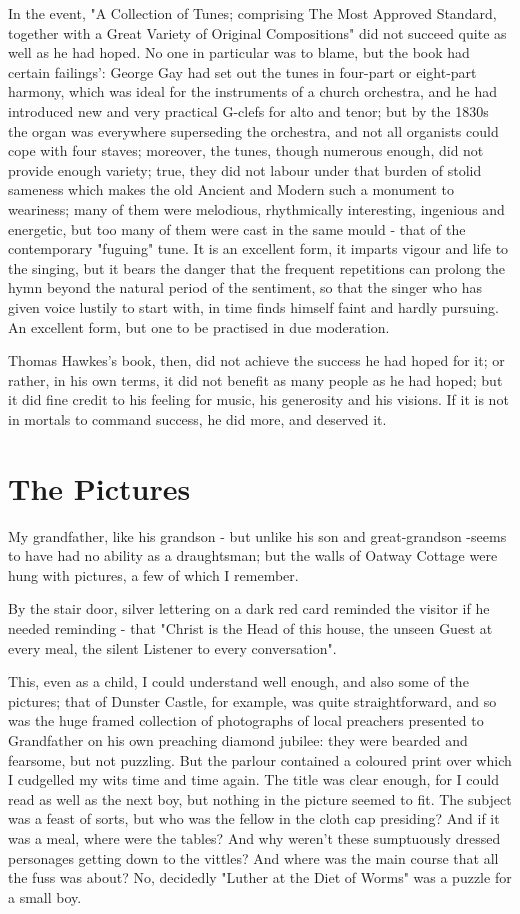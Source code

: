 In the event, "A Collection of Tunes; comprising The Most Approved Standard, together with a Great Variety of Original Compositions" did not succeed quite as well as he had hoped. No one in particular was to blame, but the book had certain failings': George Gay had set out the tunes in four-part or eight-part harmony, which was ideal for the instruments of a church orchestra, and he had introduced new and very practical G-clefs for alto and tenor; but by the 1830s the organ was everywhere superseding the orchestra, and not all organists could cope with four staves; moreover, the tunes, though numerous enough, did not provide enough variety; true, they did not labour under that burden of stolid sameness which makes the old Ancient and Modern such a monument to weariness; many of them were melodious, rhythmically interesting, ingenious and energetic, but too many of them were cast in the same mould - that of the contemporary "fuguing" tune. It is an excellent form, it imparts vigour and life to the singing, but it bears the danger that the frequent repetitions can prolong the hymn beyond the natural period of the sentiment, so that the singer who has given voice lustily to start with, in time finds himself faint and hardly pursuing. An excellent form, but one to be practised in due moderation.

Thomas Hawkes's book, then, did not achieve the success he had hoped for it; or rather, in his own terms, it did not benefit as many people as he had hoped; but it did fine credit to his feeling for music, his generosity and his visions. If it is not in mortals to command success, he did more, and deserved it.
 
\section{The Pictures}

My grandfather, like his grandson - but unlike his son and great-grandson -seems to have had no ability as a draughtsman; but the walls of Oatway Cottage were hung with pictures, a few of which I remember.

By the stair door, silver lettering on a dark red card reminded the visitor if he needed reminding - that "Christ is the Head of this house, the unseen Guest at every meal, the silent Listener to every conversation".

This, even as a child, I could understand well enough, and also some of the pictures; that of Dunster Castle, for example, was quite straightforward, and so was the huge framed collection of photographs of local preachers presented to Grandfather on his own preaching diamond jubilee: they were bearded and fearsome, but not puzzling. But the parlour contained a coloured print over which I cudgelled my wits time and time again. The title was clear enough, for I could read as well as the next boy, but nothing in the picture seemed to fit. The subject was a feast of sorts, but who was the fellow in the cloth cap presiding? And if it was a meal, where were the tables? And why weren't these sumptuously dressed personages getting down to the vittles? And where was the main course that all the fuss was about? No, decidedly "Luther at the Diet of Worms" was a puzzle for a small boy.

